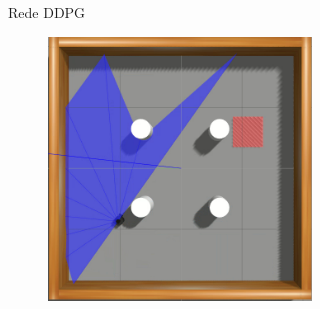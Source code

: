\begin{figure}[H]
\begin{center}
\begin{subfigure}[b]{0.60\textwidth}
\begin{subfigure}[b]{0.24\textwidth}
        \end{subfigure}
        \caption{Rede DDPG}
        \label{subfig:simulated_env2_ddpg}
    \end{subfigure}
      
    \begin{subfigure}[b]{0.60\textwidth}
        \begin{subfigure}[b]{0.24\textwidth}
            \includegraphics[width=\textwidth]{imagens/simulated_envs/sim_env2_sac/1.png}
        \end{subfigure}
        \hfill
        \begin{subfigure}[b]{0.24\textwidth}

\end{subfigure}
\end{subfigure}
\end{center}
\end{figure}
